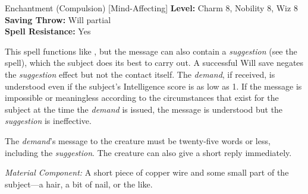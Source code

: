 {Enchantment (Compulsion) [Mind-Affecting]}
{
	\textbf{Level:}
	Charm 8, Nobility 8, Wiz 8\\
	\textbf{Saving Throw:}
	Will partial\\
	\textbf{Spell Resistance:}
	Yes\\
}
{
	This spell functions like , but the message can also contain a \emph{suggestion} (see the  spell), which the subject does its best to carry out. A successful Will save negates the \emph{suggestion} effect but not the contact itself. The \emph{demand}, if received, is understood even if the subject's Intelligence score is as low as 1. If the message is impossible or meaningless according to the circumstances that exist for the subject at the time the \emph{demand} is issued, the message is understood but the \emph{suggestion} is ineffective.

	The \emph{demand}'s message to the creature must be twenty-five words or less, including the \emph{suggestion}. The creature can also give a short reply immediately.

	\textit{Material Component:}
	A short piece of copper wire and some small part of the subject---a hair, a bit of nail, or the like.

}
